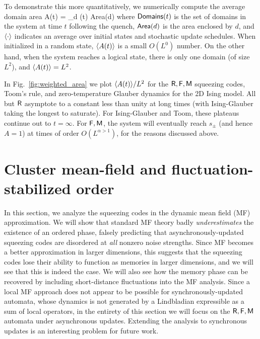 \documentclass[pra,aps,twocolumn,groupedaddress,superscriptaddress,nofootinbib,preprintnumbers]{revtex4-2}
\begin{document}
	To demonstrate this more quantitatively, we numerically compute the average domain area
	\be \lan A(t) \ran = \left\lan \sum_{d (t)} {\sf Area}(d) \right \ran \ee 
	where ${\sf Domains}(t)$ is the set of domains in the system at time $t$ following the quench, ${\sf Area}(d)$ is the area enclosed by $d$, and $\langle \cdot \rangle$ indicates an average over initial states and stochastic update schedules. When initialized in a random state, $\langle A(t)\rangle$ is a small $O(L^0)$ number. On the other hand, when the system reaches a logical state, there is only one domain (of size $L^2$), and $\langle A(t)\rangle = L^2$. 
	
	In Fig.~\ref{fig:weighted_area} we plot $\langle A(t)\rangle / L^2$ for the $\mathsf{R},\mathsf{F},\mathsf{M}$ squeezing codes, Toom's rule, and zero-temperature Glauber dynamics for the 2D Ising model. All but $\mathsf{R}$ asymptote to a constant less than unity at long times (with Ising-Glauber taking the longest to saturate). For Ising-Glauber and Toom, these plateaus continue out to $t = \infty$. For $\mathsf{F}, \mathsf{M}$, the system will eventually reach $s_\pm$ (and hence $A = 1$) at times of order $O(L^{\alpha > 1})$, for the reasons discussed above. 
	
	
	
	
	
	\section{Cluster mean-field and fluctuation-stabilized order}\label{sec:meanfield} 
	
	In this section, we analyze the squeezing codes in the dynamic mean field (MF) approximation. We will show that standard MF theory badly {\it underestimates} the existence of an ordered phase, falsely predicting that asynchronously-updated squeezing codes are disordered at {\it all} nonzero noise strengths. Since MF becomes a better approximation in larger dimensions, this suggests that the squeezing codes lose their ability to function as memories in larger dimensions, and we will see that this is indeed the case. We will also see how the memory phase can be recovered by including short-distance fluctuations into the MF analysis. Since a local MF approach does not appear to be possible for synchronously-updated automata, whose dynamics is not generated by a Lindbladian expressible as a sum of local operators, in the entirety of this section we will focus on the $\mathsf{R},\mathsf{F},\mathsf{M}$ automata under asynchronous updates. Extending the analysis to synchronous updates is an interesting problem for future work. 
	
\end{document}
